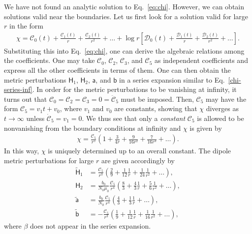 \documentclass[aps,prd,preprintnumbers,superscriptaddress,nofootinbib,notitlepage]{revtex4-2}
\begin{document}
We have not found an analytic solution to Eq.~\eqref{eq:chi}.
However, we can obtain solutions valid near the boundaries.
Let us first look for a solution valid for large $r$ in the form
\begin{align}
    \chi=
    \mathcal C_0(t)+\frac{\mathcal C_1(t)}{r}+\frac{\mathcal C_2(t)}{r^2}+\ldots+\log r\left[\mathcal D_0(t)+\frac{\mathcal D_1(t)}{r}+\frac{\mathcal D_2(t)}{r^2}+\dots\right].
    \label{chi-series-inf}
\end{align}
Substituting this into Eq.~\eqref{eq:chi}, one can derive the algebraic relations among the coefficients. One may take $\mathcal C_0$, $\mathcal C_2$, $\mathcal C_3$, and $\mathcal C_5$ as independent coefficients and express all the other coefficients in terms of them.
One can then obtain the metric perturbations
$\mathsf H_1$, $\mathsf H_2$, $\mathsf a$, and $\mathsf b$
in a series expansion similar to Eq.~\eqref{chi-series-inf}.
In order for the metric perturbations to be vanishing at infinity,
it turns out that $\mathcal C_0=\mathcal C_2=\mathcal C_3=0=\ddot{\mathcal{C}}_5$ must be imposed.
Then, $\mathcal{C}_5$ may have the form $\mathcal{C}_5=v_1t+v_0$, where
$v_1$ and $v_0$ are constants, showing that $\chi$ diverges as $t\to\infty$
unless $\dot{\mathcal{C}}_5=v_1=0$.
We thus see that only a \textit{constant} $\mathcal{C}_5$ is allowed to be nonvanishing from the boundary conditions at infinity and $\chi$ is given by
\begin{align}
    \chi=\frac{\mathcal{C}_5}{r^5}\left(1+\frac{3}{4r}+\frac{9}{16r^2}+\frac{7}{16r^3}+\dots\right).\label{bc:chi-inf}
\end{align}
In this way, $\chi$ is uniquely determined up to an overall constant.
The dipole metric perturbations for large $r$ are given accordingly by
\begin{align}
    \widetilde{\mathsf H}_1&=\frac{\mathcal{C}_5}{r^3}\left(\frac{2}{9}+\frac{1}{12}\frac{1}{r}+\frac{1}{24}\frac{1}{r^2}+\dots\right),\\
    \mathsf H_2&=\frac{b_0}{N_0\mu_0}\frac{\mathcal{C}_5}{r^4}\left(\frac{8}{3}+\frac{4}{3}\frac{1}{r}+\frac{5}{6}\frac{1}{r^2}+\dots\right),\\
    \widetilde{\mathsf a}&=\frac{b_0}{N_0}\frac{\mathcal{C}_5}{r^4}\left(\frac{4}{3}+\frac{1}{3}\frac{1}{r}+\dots\right),\\
    \widetilde{\mathsf b}&=-\frac{\mathcal{C}_5}{r^3}\left(\frac{1}{9}+\frac{1}{12}\frac{1}{r}+\frac{1}{16}\frac{1}{r^2}+\dots\right),
\end{align}
where $\beta$ does not appear in the series expansion.
\end{document}
